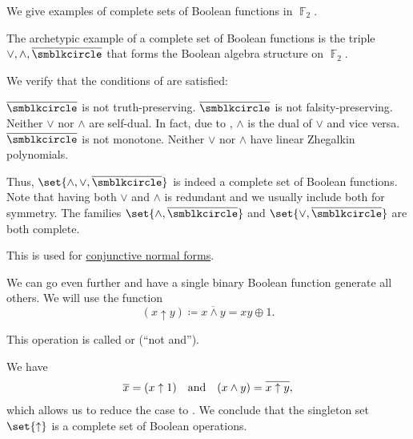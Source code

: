 \begin{example}\label{ex:thm:posts_completeness_theorem}
  We give examples of complete sets of Boolean functions in \( \BbbF_2 \).

  \begin{thmenum}
     The archetypic example of a complete set of Boolean functions is the triple \( \vee, \wedge, \overline{\anon} \) that forms the Boolean algebra structure on \( \BbbF_2 \).

    We verify that the conditions of  are satisfied:
    \begin{refenum}
       \( \overline{\anon} \) is not truth-preserving.
       \( \overline{\anon} \) is not falsity-preserving.
       Neither \( \vee \) nor \( \wedge \) are self-dual. In fact, due to , \( \wedge \) is the dual of \( \vee \) and vice versa.
       \( \overline{\anon} \) is not monotone.
       Neither \( \vee \) nor \( \wedge \) have linear Zhegalkin polynomials.
    \end{refenum}

    Thus, \( \set{ \wedge, \vee, \overline{\anon} } \) is indeed a complete set of Boolean functions. Note that having both \( \vee \) and \( \wedge \) is redundant and we usually include both for symmetry. The families \( \set{ \wedge, \overline{\anon} } \) and \( \set{ \vee, \overline{\anon} } \) are both complete.

    This is used for \hyperref[alg:conjunctive_normal_form_reduction]{conjunctive normal forms}.

     We can go even further and have a single binary Boolean function generate all others. We will use the function
    \begin{equation}\label{eq:ex:thm:posts_completeness_theorem/nand}
      (x \uparrow y) \coloneqq \overline{x \wedge y} = xy \oplus 1.
    \end{equation}

    This operation is called  or  (\enquote{not and}).

    We have
    \begin{equation*}
      \begin{array}{ccc}
        \overline{x} = (x \uparrow 1)
        &
        \T{and}
        &
        (x \wedge y) = \overline{x \uparrow y},
      \end{array}
    \end{equation*}
    which allows us to reduce the case to . We conclude that the singleton set \( \set{ \uparrow } \) is a complete set of Boolean operations.


\end{thmenum}
\end{example}
